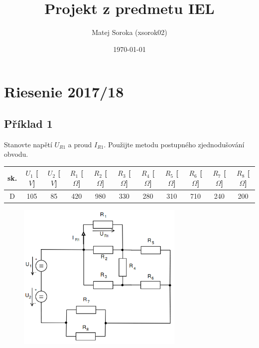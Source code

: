 \documentclass[a4paper,oneside,12pt]{article}
\author{Matej Soroka (xsorok02)}
\date{\today}
\title{Projekt z predmetu IEL}
\begin{document}
	\maketitle
	\newpage

	\tableofcontents
	\newpage

	\section{Riesenie 2017/18}
	\maketitle

	\subsection{Příklad 1}

	Stanovte napětí $U_{R1}$ a proud $I_{R1}$. Použijte metodu postupného
	zjednodušování obvodu.

	\begin{table}[h]
		\begin{center}
			\begin{tabular}{|c|c|c|c|c|c|c|c|c|c|c|}
				\hline
				sk. & $U_{1}$ [$V$] & $U_{2}$ [$V$] & $R_{1}$ [$\Omega$] & $R_{2}$ [$\Omega$] & $R_{3}$ [$\Omega$] & $R_{4}$ [$\Omega$] & $R_{5}$ [$\Omega$] & $R_{6}$ [$\Omega$] & $R_{7}$ [$\Omega$] & $R_{8}$ [$\Omega$] \\
				\hline
				D & 105 & 85 & 420 & 980 & 330 & 280 & 310 & 710 & 240 & 200 \\
				\hline
			\end{tabular}
		\end{center}
	\end{table}

	\begin{figure}[h]
		\begin{center}
			\includegraphics[width=8cm,keepaspectratio]{pr1.png}
		\end{center}
	\end{figure}
\end{document}
